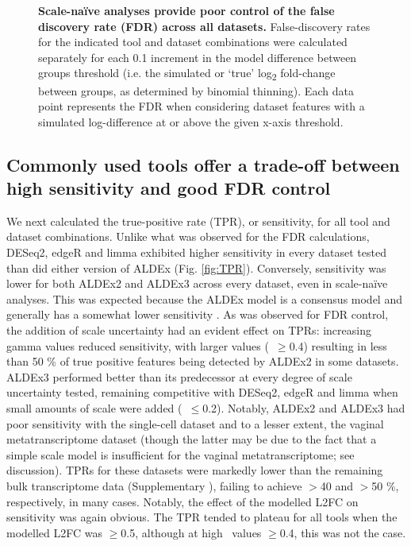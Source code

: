 \documentclass[10pt,letterpaper]{article}
\begin{document}
\begin{figure}[H]
    \centering
    \caption{\textbf{Scale-na\"ive analyses provide poor control of the false discovery rate (FDR) across all datasets.} False-discovery rates for the indicated tool and dataset combinations were calculated separately for each 0.1 increment in the model difference between groups threshold (i.e. the simulated or `true' log\textsubscript{2} fold-change between groups, as determined by binomial thinning). Each data point represents the FDR when considering dataset features with a simulated log-difference at or above the given x-axis threshold.}
    \label{fig:FDR}
\end{figure}

\subsection*{Commonly used tools offer a trade-off between high sensitivity and good FDR control}
We next calculated the true-positive rate (TPR), or sensitivity, for all tool and dataset combinations. Unlike what was observed for the FDR calculations, DESeq2, edgeR and limma exhibited higher sensitivity in every dataset tested than did either version of ALDEx (Fig. \ref{fig:TPR}). Conversely, sensitivity was lower for both ALDEx2 and ALDEx3 across every dataset, even in scale-na\"ive analyses. This was expected because the ALDEx model is a consensus model \cite{fernandes:2014} and generally has a somewhat lower sensitivity \cite{hawinkel2017, Nearing:2022aa}. As was observed for FDR control, the addition of scale uncertainty had an evident effect on TPRs: increasing gamma values reduced sensitivity, with larger values (\textgamma~$\geq$0.4) resulting in less than 50 \% of true positive features being detected by ALDEx2 in some datasets. ALDEx3 performed better than its predecessor at every degree of scale uncertainty tested, remaining competitive with DESeq2, edgeR and limma when small amounts of scale were added (\textgamma~$\leq$0.2). Notably, ALDEx2 and ALDEx3 had poor sensitivity with the single-cell dataset and to a lesser extent, the vaginal metatranscriptome dataset (though the latter may be due to the fact that a simple scale model is insufficient for the vaginal metatranscriptome; see discussion). TPRs for these datasets were markedly lower than the remaining bulk transcriptome data (Supplementary ), failing to achieve $>$40 and $>$50 \%, respectively, in many cases. Notably, the effect of the modelled L2FC on sensitivity was again obvious. The TPR tended to plateau for all tools when the modelled L2FC was $\geq$0.5, although at high \textgamma~values $\ge$0.4, this was not the case. 
\end{document}
